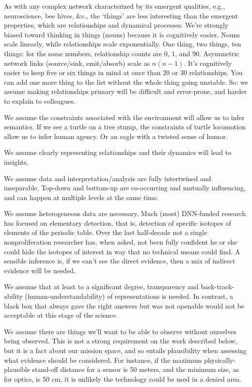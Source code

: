 \documentclass{article} %
\begin{document}
As with any complex network characterized by its emergent qualities, e.g., neuroscience, bee hives, \&c., the `things' are less interesting than the emergent properties, which are relationships and dynamical processes. We're strongly biased toward thinking in things (nouns) because it is cognitively easier. Nouns scale linearly, while relationships scale exponentially. One thing, two things, ten things: for the same numbers, relationship counts are 0, 1, and 90. Asymmetric network links (source/sink, emit/absorb) scale as $n(n-1)$. It's cognitively easier to keep five or six things in mind at once than 20 or 30 relationships. You can add one more thing to the list without the whole thing going unstable. So: we assume making relationships  primary will be difficult and error-prone, and harder to explain to colleagues.

We assume the constraints associated with the environment will allow us to infer semantics. If we see a turtle on a tree stump, the constraints of turtle locomotion allow us to infer human agency. Or an eagle with a twisted sense of humor.

We assume clearly representing relationships and their dynamics will lead to insights.

We assume data and interpretation/analysis are fully intertwined and inseparable. Top-down and bottom-up are co-occurring and mutually influencing, and can happen at multiple levels at the same time.

We assume heterogeneous data are necessary. Much (most) DNN-funded research has focused on elementary detection, that is, detection of specific isotopes of elements of the periodic table. Over the last half-decade not a single nonproliferation researcher has, when asked, not been fully confident he or she could hide the isotopes of interest in way that no technical means could find. A sensible inference is, if we can't see the direct evidence, then a mix of indirect evidence will be needed. 

We assume that at least to a significant degree, transparency and back-track-ability (human-understandability) of representations is needed. In contrast, a black box that always gave the right answers but was not openable would not be acceptable at this stage of the science.

We assume there are things we'll want to be able to observe without ourselves being observed. This is not a strong requirement on the work described below, but it is a fact about our mission space, and so entails plausibility when assessing what evidence should be considered. For instance, if the maximum physically-plausible stand-off distance for a sensor is 50 meters, and the minimum size, as for optics, is 50 cm, it is unlikely the technology could be used in a denied area. 
\end{document}
